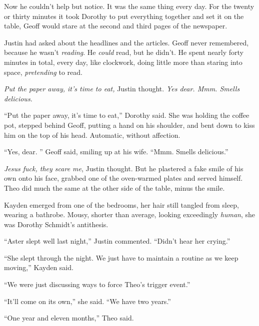 Now he couldn't help but notice.  It was the same thing every day.  For the twenty or thirty minutes it took Dorothy to put everything together and set it on the table, Geoff would stare at the second and third pages of the newspaper.



Justin had asked about the headlines and the articles.  Geoff never remembered, because he wasn't \emph{reading}.  He \emph{could} read, but he didn't. He spent nearly forty minutes in total, every day, like clockwork, doing little more than staring into space, \emph{pretending} to read.



\emph{Put the paper away, it's time to eat, }Justin thought.  \emph{Yes dear.  Mmm.  Smells delicious.}



``Put the paper away, it's time to eat,'' Dorothy said.  She was holding the coffee pot, stepped behind Geoff, putting a hand on his shoulder, and bent down to kiss him on the top of his head.  Automatic, without affection.



``Yes, dear.  '' Geoff said, smiling up at his wife.  ``Mmm.  Smells delicious.''



\emph{Jesus fuck, they scare me}, Justin thought.  But he plastered a fake smile of his own onto his face, grabbed one of the oven-warmed plates and served himself.  Theo did much the same at the other side of the table, minus the smile.



Kayden emerged from one of the bedrooms, her hair still tangled from sleep, wearing a bathrobe.  Mousy, shorter than average, looking exceedingly \emph{human}, she was Dorothy Schmidt's antithesis.



``Aster slept well last night,'' Justin commented.  ``Didn't hear her crying.''



``She slept through the night.  We just have to maintain a routine as we keep moving,'' Kayden said.



``We were just discussing ways to force Theo's trigger event.''



``It'll come on its own,'' she said.  ``We have two years.''



``One year and eleven months,'' Theo said.



